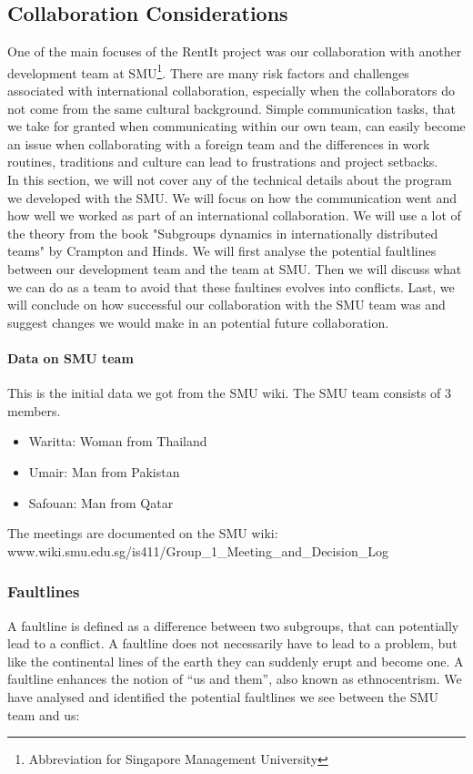 \documentclass[a4paper,11pt,report]{article}
\begin{document}
\subsection{Collaboration Considerations}
One of the main focuses of the RentIt project was our collaboration with another development team at SMU\footnote{Abbreviation for Singapore Management University}. There are many risk factors and challenges associated with international collaboration, especially when the collaborators do not come from the same cultural background. Simple communication tasks, that we take for granted when communicating within our own team, can easily become an issue when collaborating with a foreign team and the differences in work routines, traditions and culture can lead to frustrations and project setbacks. \\

In this section, we will not cover any of the technical details about the program we developed with the SMU. We will focus on how the communication went and how well we worked as part of an international collaboration. We will use a lot of the theory from the book "Subgroups dynamics in internationally distributed teams" by Crampton and Hinds. We will first analyse the potential faultlines\cite{smu} between our development team and the team at SMU. Then we will discuss what we can do as a team to avoid that these faultines evolves into conflicts. Last, we will conclude on how successful our collaboration with the SMU team was and suggest changes we would make in an potential future collaboration.\\

\paragraph{Data on SMU team}

This is the initial data we got from the SMU wiki. The SMU team consists of 3 members.\\

\begin{itemize}
\item Waritta: Woman from Thailand
\item Umair: Man from Pakistan
\item Safouan: Man from Qatar
\end{itemize}
The meetings are documented on the SMU wiki: \\
www.wiki.smu.edu.sg/is411/Group\_1\_Meeting\_and\_Decision\_Log
\subsubsection{Faultlines}
A faultline is defined as a difference between two subgroups, that can potentially lead to a conflict. A faultline does not necessarily have to lead to a problem, but like the continental lines of the earth they can suddenly erupt and become one. A faultline enhances the notion of “us and them”, also known as ethnocentrism\cite{smu}. We have analysed and identified the potential faultlines we see between the SMU team and us:
\end{document}
